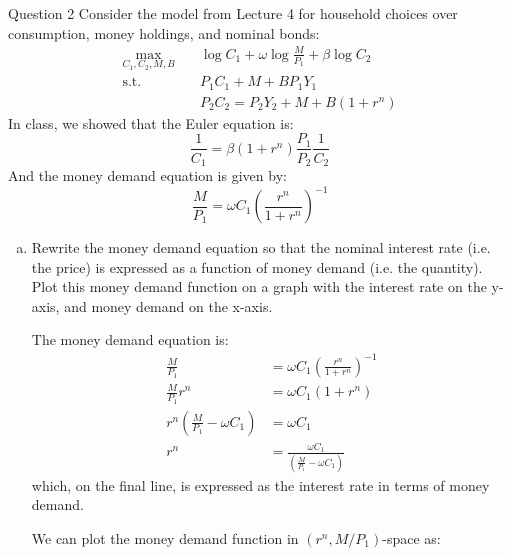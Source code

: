 \documentclass[a4paper]{article}
\newif\IfInSansMode
\begin{document}
	\begin{questionbox}{Question 2}
		Consider the model from Lecture 4 for household choices over consumption, money holdings, and nominal bonds:
		\begin{align*}
			\max_{C_1,C_2,M,B} \quad &\log C_1 + \omega\log \frac{M}{P_1} + \beta\log C_2 \\
			\text{s.t.} \quad &P_1C_1 + M + B P_1Y_1\\
			&P_2C_2 = P_2Y_2 + M + B (1+r^n)
		\end{align*}
		In class, we showed that the Euler equation is:
		\begin{equation}
			\frac{1}{C_1} = \beta(1+r^n)\frac{P_1}{P_2}\frac{1}{C_2} \label{4.1}
		\end{equation}
		And the money demand equation is given by:
		\begin{equation}
			\frac{M}{P_1} = \omega C_1 \left( \frac{r^n}{1 + r^n} \right)^{-1} \label{4.2}
		\end{equation}
		\begin{enumerate}[(a)]
			\item Rewrite the money demand equation so that the nominal interest rate (i.e. the price) is expressed as a function of money demand (i.e. the quantity). Plot this money demand function on a graph with the interest rate on the y-axis, and money demand on the x-axis.
			\begin{explanationbox}
				The money demand equation is:
					\begin{align*}
						\frac{M}{P_1} &= \omega C_1 \left( \frac{r^n}{1 + r^n} \right)^{-1}\\
						\frac{M}{P_1} r^n &= \omega C_1 (1+r^n)\\
						r^n\left( \frac{M}{P_1} - \omega C_1 \right) &= \omega C_1\\
						r^n &= \frac{\omega C_1}{\left( \frac{M}{P_1} - \omega C_1 \right)}
					\end{align*}
					which, on the final line, is expressed as the interest rate in terms of money demand.
			\end{explanationbox}
			\begin{explanationbox}
				We can plot the money demand function in \( (r^n, M/P_1) \)-space as:
				\begin{figure}[H]
					\centering
\end{figure}
\end{explanationbox}
\end{enumerate}
\end{questionbox}
\end{document}
